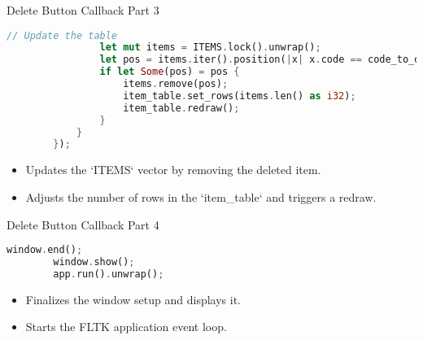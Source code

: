 \documentclass[aspectratio=169, table]{beamer}
\begin{document}
		\begin{frame}[fragile]{Delete Button Callback Part 3}
			\begin{lstlisting}[language=Rust]
				// Update the table
				let mut items = ITEMS.lock().unwrap();
				let pos = items.iter().position(|x| x.code == code_to_delete);
				if let Some(pos) = pos {
					items.remove(pos);
					item_table.set_rows(items.len() as i32);
					item_table.redraw();
				}
			}
		});
	\end{lstlisting}
	
	\begin{itemize}
		\item Updates the `ITEMS` vector by removing the deleted item.
		\item Adjusts the number of rows in the `item\_table` and triggers a redraw.
	\end{itemize}
\end{frame}

\begin{frame}[fragile]{Delete Button Callback Part 4}
	\begin{lstlisting}[language=Rust]
		window.end();
		window.show();
		app.run().unwrap();
	\end{lstlisting}
	
	\begin{itemize}
		\item Finalizes the window setup and displays it.
		\item Starts the FLTK application event loop.
	\end{itemize}
\end{frame}
\end{document}
